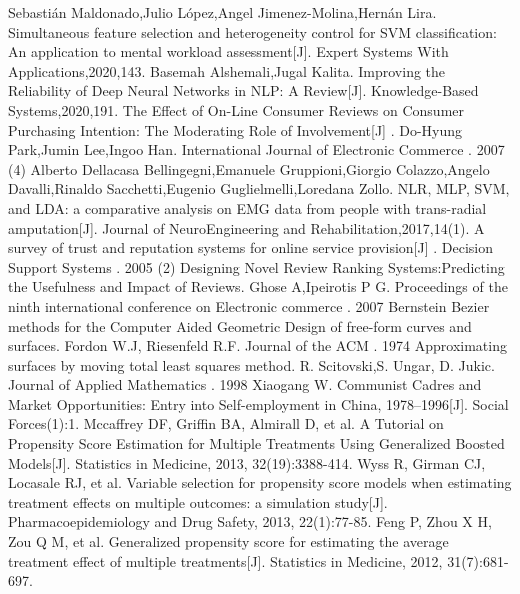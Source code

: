 \documentclass{mcmthesis}
\begin{document}
\begin{thebibliography}{99}
Sebastián Maldonado,Julio López,Angel Jimenez-Molina,Hernán Lira. Simultaneous feature selection and heterogeneity control for SVM classification: An application to mental workload assessment[J]. Expert Systems With Applications,2020,143.
Basemah Alshemali,Jugal Kalita. Improving the Reliability of Deep Neural Networks in NLP: A Review[J]. Knowledge-Based Systems,2020,191.
The Effect of On-Line Consumer Reviews on Consumer Purchasing Intention: The Moderating Role of Involvement[J] . Do-Hyung Park,Jumin Lee,Ingoo Han.  International Journal of Electronic Commerce . 2007 (4)
Alberto Dellacasa Bellingegni,Emanuele Gruppioni,Giorgio Colazzo,Angelo Davalli,Rinaldo Sacchetti,Eugenio Guglielmelli,Loredana Zollo. NLR, MLP, SVM, and LDA: a comparative analysis on EMG data from people with trans-radial amputation[J]. Journal of NeuroEngineering and Rehabilitation,2017,14(1).
A survey of trust and reputation systems for online service provision[J] .   Decision Support Systems . 2005 (2)
Designing Novel Review Ranking Systems:Predicting the Usefulness and Impact of Reviews. Ghose A,Ipeirotis P G. Proceedings of the ninth international conference on Electronic commerce . 2007
Bernstein Bezier methods for the Computer Aided Geometric Design of free-form curves and surfaces. Fordon W.J, Riesenfeld R.F. Journal of the ACM . 1974
Approximating surfaces by moving total least squares method. R. Scitovski,S. Ungar, D. Jukic. Journal of Applied Mathematics . 1998
Xiaogang W. Communist Cadres and Market Opportunities: Entry into Self-employment in China, 1978–1996[J]. Social Forces(1):1.
Mccaffrey DF, Griffin BA, Almirall D, et al. A Tutorial on Propensity Score Estimation for Multiple Treatments Using Generalized Boosted Models[J]. Statistics in Medicine, 2013, 32(19):3388-414.
Wyss R, Girman CJ, Locasale RJ, et al. Variable selection for propensity score models when estimating treatment effects on multiple outcomes: a simulation study[J]. Pharmacoepidemiology and Drug Safety, 2013, 22(1):77-85.
Feng P, Zhou X H, Zou Q M, et al. Generalized propensity score for estimating the average treatment effect of multiple treatments[J]. Statistics in Medicine, 2012, 31(7):681-697.
\end{thebibliography}
\end{document}
